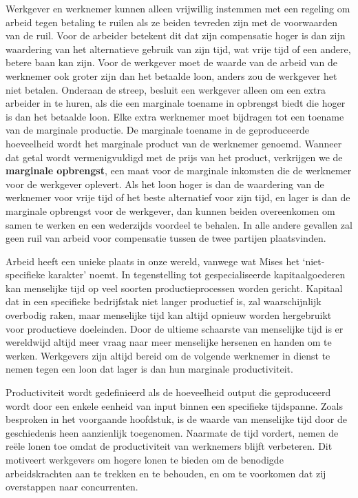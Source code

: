 Werkgever en werknemer kunnen alleen vrijwillig instemmen met een
regeling om arbeid tegen betaling te ruilen als ze beiden tevreden zijn
met de voorwaarden van de ruil. Voor de arbeider betekent dit dat zijn
compensatie hoger is dan zijn waardering van het alternatieve gebruik
van zijn tijd, wat vrije tijd of een andere, betere baan kan zijn. Voor
de werkgever moet de waarde van de arbeid van de werknemer ook groter
zijn dan het betaalde loon, anders zou de werkgever het niet betalen.
Onderaan de streep, besluit een werkgever alleen om een extra arbeider
in te huren, als die een marginale toename in opbrengst biedt die hoger
is dan het betaalde loon. Elke extra werknemer moet bijdragen tot een
toename van de marginale productie. De marginale toename in de
geproduceerde hoeveelheid wordt het marginale product van de werknemer
genoemd. Wanneer dat getal wordt vermenigvuldigd met de prijs van het
product, verkrijgen we de \textbf{marginale opbrengst}, een maat voor de
marginale inkomsten die de werknemer voor de werkgever oplevert. Als het
loon hoger is dan de waardering van de werknemer voor vrije tijd of het
beste alternatief voor zijn tijd, en lager is dan de marginale opbrengst
voor de werkgever, dan kunnen beiden overeenkomen om samen te werken en
een wederzijds voordeel te behalen. In alle andere gevallen zal geen
ruil van arbeid voor compensatie tussen de twee partijen plaatsvinden.

Arbeid heeft een unieke plaats in onze wereld, vanwege wat Mises het
`niet-specifieke karakter' noemt.\autocite{41} In tegenstelling tot gespecialiseerde
kapitaalgoederen kan menselijke tijd op veel soorten
productieprocessen worden gericht. Kapitaal dat in een specifieke
bedrijfstak niet langer productief is, zal waarschijnlijk
overbodig raken, maar menselijke tijd kan altijd opnieuw worden
hergebruikt voor productieve doeleinden. Door de ultieme schaarste van
menselijke tijd is er wereldwijd altijd meer vraag naar meer menselijke
hersenen en handen om te werken. Werkgevers zijn altijd bereid
om de volgende werknemer in dienst te nemen tegen een loon dat lager is
dan hun marginale productiviteit.

Productiviteit wordt gedefinieerd als de hoeveelheid output die geproduceerd wordt door een enkele eenheid van input binnen een specifieke tijdspanne. Zoals besproken in het voorgaande hoofdstuk, is de waarde van menselijke tijd door de geschiedenis heen aanzienlijk toegenomen. Naarmate de tijd vordert, nemen de reële lonen toe omdat de productiviteit van werknemers blijft verbeteren. Dit motiveert werkgevers om hogere lonen te bieden om de benodigde arbeidskrachten aan te trekken en te behouden, en om te voorkomen dat zij overstappen naar concurrenten.

